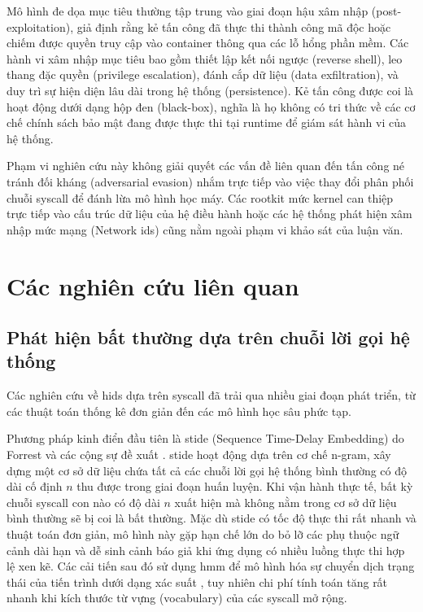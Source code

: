 \documentclass[../main.tex]{subfiles}
\begin{document}
Mô hình đe dọa mục tiêu thường tập trung vào giai đoạn hậu xâm nhập
(post-exploitation), giả định rằng kẻ tấn công đã thực thi thành công
mã độc hoặc chiếm được quyền truy cập vào container thông qua các lỗ
hổng phần mềm. Các hành vi xâm nhập mục tiêu bao gồm thiết lập kết
nối ngược (reverse shell), leo thang đặc quyền (privilege
escalation), đánh cắp dữ liệu (data exfiltration), và duy trì sự hiện
diện lâu dài trong hệ thống (persistence). Kẻ tấn công được coi là
hoạt động dưới dạng hộp đen (black-box), nghĩa là họ không có tri
thức về các cơ chế chính sách bảo mật đang được thực thi tại runtime
để giám sát hành vi của hệ thống.

Phạm vi nghiên cứu này không giải quyết các vấn đề liên quan đến tấn
công né tránh đối kháng (adversarial evasion) nhắm trực tiếp vào việc
thay đổi phân phối chuỗi \gls{syscall} để đánh lừa mô hình học máy. Các
rootkit mức kernel can thiệp trực tiếp vào cấu trúc dữ liệu của hệ
điều hành hoặc các hệ thống phát hiện xâm nhập mức mạng (Network \gls{ids})
cũng nằm ngoài phạm vi khảo sát của luận văn.

\section{Các nghiên cứu liên quan}
\label{sec:related_work}

\subsection{Phát hiện bất thường dựa trên chuỗi lời gọi hệ thống}
Các nghiên cứu về \gls{hids} dựa
trên \gls{syscall} đã trải qua nhiều giai đoạn phát triển, từ các thuật
toán thống kê đơn giản đến các mô hình học sâu phức tạp.

Phương pháp kinh điển đầu tiên là \gls{stide} (Sequence Time-Delay
Embedding) do Forrest và các cộng sự đề xuất \cite{forrest1996sense}.
\Gls{stide} hoạt động dựa trên cơ chế n-gram, xây dựng một cơ sở dữ liệu
chứa tất cả các chuỗi lời gọi hệ thống bình thường có độ dài cố định
$n$ thu được trong giai đoạn huấn luyện. Khi vận hành thực tế, bất kỳ
chuỗi \gls{syscall} con nào có độ dài $n$ xuất hiện mà không nằm trong cơ
sở dữ liệu bình thường sẽ bị coi là bất thường. Mặc dù \gls{stide} có tốc
độ thực thi rất nhanh và thuật toán đơn giản, mô hình này gặp hạn chế
lớn do bỏ lỡ các phụ thuộc ngữ cảnh dài hạn và dễ sinh cảnh báo giả
khi ứng dụng có nhiều luồng thực thi hợp lệ xen kẽ. Các cải tiến sau
đó sử dụng \gls{hmm} để mô hình
hóa sự chuyển dịch trạng thái của tiến trình dưới dạng xác suất
\cite{warrender1999detecting}, tuy
nhiên chi phí tính toán tăng rất nhanh khi kích thước từ vựng
(vocabulary) của các \gls{syscall} mở rộng.
\end{document}
